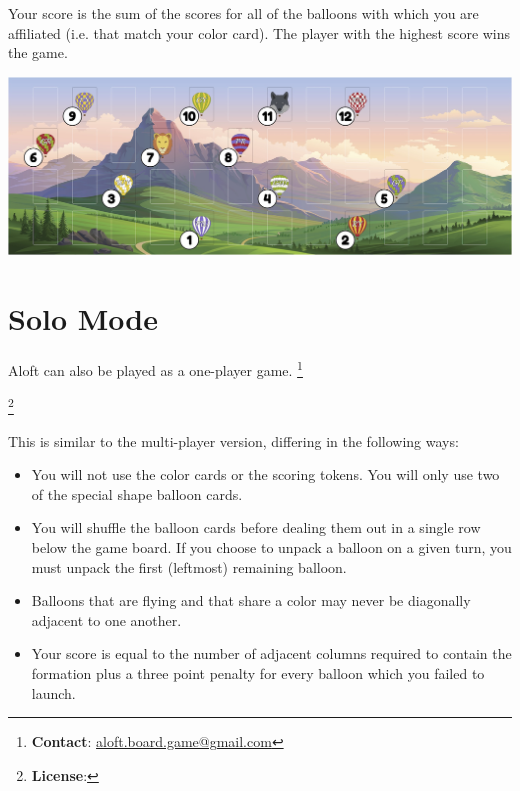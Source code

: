\documentclass[a6paper, 11pt, parskip=half, DIV=15]{scrartcl}
\newcommand\blfootnote[1]{%
  \begingroup
  \renewcommand\thefootnote{}\footnote{#1}%
  \addtocounter{footnote}{-1}%
  \endgroup
}
\renewcommand{\thefootnote}{\fnsymbol{footnote}}
\begin{document}

Your score is the sum of the scores for all of the balloons with which you are affiliated (i.e. that match your color card). The player with the highest score wins the game.

\begin{center}
\includegraphics[scale=0.115]{scoring_diagram.jpg}
\end{center}

\newpage
\enlargethispage{1.75\baselineskip}
\section*{Solo Mode}
Aloft can also be played as a one-player game.
\blfootnote{\textbf{Contact}: \href{mailto:aloft.board.game@gmail.com}{aloft.board.game@gmail.com}}
\blfootnote{\textbf{License}: \raggedright\doclicenseLongText}
This is similar to the multi-player version, differing in the following ways:
\begin{itemize}
  \item You will not use the color cards or the scoring tokens. You will only use two of the special shape balloon cards.
  \item You will shuffle the balloon cards before dealing them out in a single row below the game board. If you choose to unpack a balloon on a given turn, you must unpack the first (leftmost) remaining balloon.
  \item Balloons that are flying and that share a color may never be diagonally adjacent to one another.
  \item Your score is equal to the number of adjacent columns required to contain the formation plus a three point penalty for every balloon which you failed to launch.
\end{itemize}
\end{document}
